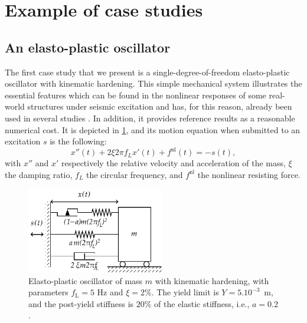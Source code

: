



\section{Example of case studies}\label{sec:intro-frags:casstudies}

    \subsection{An elasto-plastic oscillator}\label{sec:intro-frags:elastoplastic}

    The first case study that we present is 
    a single-degree-of-freedom elasto-plastic oscillator with kinematic hardening.
    This simple mechanical system illustrates the essential features which can be found in the nonlinear responses of some real-world structures under seismic excitation and has, for this reason, already been used in several studies \citep{trevlopoulos_parametric_2019,sainct_efficient_2020,gauchy_importance_2021}.
    In addition, it provides reference results as a reasonable numerical cost.
    It is depicted in \cref{fig:intro-frags:elasto}, and
    its motion equation when submitted to an excitation $s$ is the following:
    \begin{equation}
        x''(t) +2\xi2\pi f_L x'(t)+f^{\text{nl}}(t) = -s(t),
    \end{equation}
    with $x''$ and $x'$ respectively the relative velocity and acceleration of the mass,  $\xi$ the damping ratio, $f_L$ the circular frequency, and $f^{\text{nl}}$ the nonlinear resisting force.

    \begin{figure}[t]
        \centering
        \includegraphics[width=6cm]{figures/intro-frags/KBEPO_rheo.pdf}
        \caption{Elasto-plastic oscillator of mass $m$ with kinematic hardening, with parameters $f_{\text{L}} = 5$ Hz and $\xi = 2\%$. The yield limit is $Y = 5.10^{-3}$~m, and the post-yield stiffness is $20\%$ of the elastic stiffness, i.e., $a = 0.2$.} 
        \label{fig:intro-frags:elasto}  
    \end{figure}

